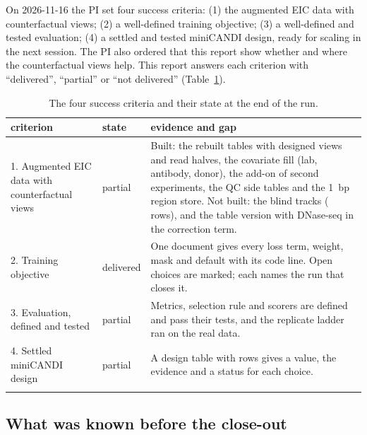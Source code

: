 \documentclass[pdflatex,sn-mathphys-num]{sn-jnl}
\newcommand{\lit}[1]{#1}
\newcommand{\cl}[1]{#1}
\begin{document}
\cl{On \lit{2026-11-16} the PI set four success criteria: (\lit{1}) the augmented EIC data with counterfactual views; (\lit{2}) a well-defined training objective; (\lit{3}) a well-defined and tested evaluation; (\lit{4}) a settled and tested miniCANDI design, ready for scaling in the next session. The PI also ordered that this report show whether and where the counterfactual views help. This report answers each criterion with ``delivered'', ``partial'' or ``not delivered'' (Table~\ref{tab:criteria}).}

\begin{table}[!htbp]
\caption{\cl{The four success criteria and their state at the end of the run.}}\label{tab:criteria}
\footnotesize
\begin{tabular}{p{3.3cm}p{1.5cm}p{7.4cm}}
\toprule
criterion & state & evidence and gap \\
\midrule
\lit{1}. Augmented EIC data with counterfactual views & partial & Built: the rebuilt tables with designed views and read halves, the covariate fill (lab, antibody, donor), the add-on of second experiments, the QC side tables and the \lit{1}~bp region store. Not built: the blind tracks (\blindRows{} rows), and the table version with DNase-seq in the correction term. \\
\lit{2}. Training objective & delivered & One document gives every loss term, weight, mask and default with its code line. Open choices are marked; each names the run that closes it. \\
\lit{3}. Evaluation, defined and tested & partial & Metrics, selection rule and scorers are defined and pass their tests, and the replicate ladder ran on the real data. \rescoreCritThree{} \\
\lit{4}. Settled miniCANDI design & partial & A design table with \nDesignRows{} rows gives a value, the evidence and a status for each choice. \rescoreCritFour{} \\
\botrule
\end{tabular}
\end{table}

\subsection{What was known before the close-out}
\end{document}
